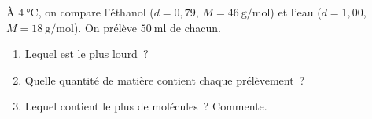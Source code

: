 \documentclass[11pt,a4paper]{article}
\begin{document}
\begin{exo}
À $\SI{4}{\celsius}$, on compare l'éthanol ($d = 0{,}79$, $M = \SI{46}{\gram\per\mole}$) et l'eau
($d = 1{,}00$, $M = \SI{18}{\gram\per\mole}$). On prélève $\SI{50}{\milli\litre}$ de chacun.
\begin{enumerate}[label=\alph*)]
  \item Lequel est le plus lourd~?
  \item Quelle quantité de matière contient chaque prélèvement~?
  \item Lequel contient le plus de molécules~? Commente.
\end{enumerate}
\end{exo}
\end{document}
